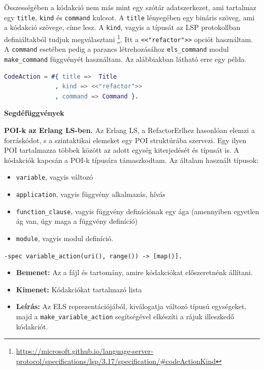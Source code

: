 Összességében a kódakció nem más mint egy szótár adatszerkezet, ami tartalmaz egy \lstinline{title}, \lstinline{kind} és \lstinline{command} kulcsot. A \lstinline{title} lényegében egy bináris szöveg, ami a kódakció szövege, címe lesz. A \lstinline{kind}, vagyis a típusát az LSP protokollban definiáltakból tudjuk megválasztani \footnote{\url{https://microsoft.github.io/language-server-protocol/specifications/lsp/3.17/specification/\#codeActionKind}}. Itt a \lstinline{<<"refactor">>} opciót használtam. A \lstinline{command} esetében pedig a parancs létrehozásához \lstinline{els_command} modul \lstinline{make_command} függvényét használtam. Az alábbiakban látható erre egy példa.

\lstset{caption=Egy példa a kódakcióra, label=src:erlang7codeActionExample}
\begin{lstlisting}[language={erlang}]
CodeAction = #{ title =>  Title
              , kind => <<"refactor">>
              , command => Command }.
\end{lstlisting}

\noindent \textbf{Segdéfüggvények}

\textbf{POI-k az Erlang LS-ben.} Az Erlang LS, a RefactorErlhez hasonlóan elemzi a forráskódot, s a szintaktikai elemeket egy POI struktúrába szervezi. Egy ilyen POI tartalmazza többek között az adott egység kiterjedését és típusát is. A kódakciók kapcsán a POI-k típusára támaszkodtam. Az általam használt típusok:
\begin{itemize}
    \item \lstinline{variable}, vagyis változó
    \item \lstinline{application}, vagyis függvény alkalmazás, hívás
    \item \lstinline{function_clause}, vagyis függvény definíciónak egy ága (amennyiben egyetlen ág van, úgy maga a függvény definíció)
    \item \lstinline{module}, vagyis modul definíció.
    
\end{itemize}

\noindent \lstinline{-spec variable_action(uri(), range()) -> [map()].}
    \begin{itemize}
        \item \textbf{Bemenet:} Az a fájl és tartomány, amire kódakciókat előszeretnénk állítani.
        \item \textbf{Kimenet:} Kódakciókat tartalmazó lista
        \item \textbf{Leírás:} Az ELS reprezentációjából, kiválogatja változó típusú egységeket, majd a \lstinline{make_variable_action} segítségével elkészíti a rájuk illeszkedő kódakciót.
    \end{itemize}
    
